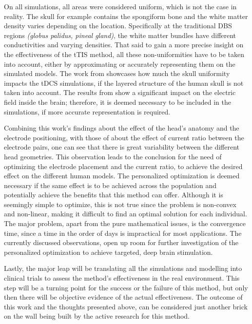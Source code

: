 On all simulations, all areas were considered uniform, which is not the case in reality. The skull for example contains the spongiform bone and the white matter density varies depending on the location. Specifically at the traditional \gls{DBS} regions \textit{(globus palidus, pineal gland)}, the white matter bundles have different conductivities and varying densities. That said to gain a more precise insight on the effectiveness of the \gls{tTIS} method, all these non-uniformities have to be taken into account, either by approximating or accurately representing them on the simulated models. The work from  showcases how much the skull uniformity impacts the \gls{tDCS} simulations, if the layered structure of the human skull is not taken into account. The results from \cite{Rampersad2013_skull_approximations} show a significant impact on the electric field inside the brain; therefore, it is deemed necessary to be included in the simulations, if more accurate representation is required.

Combining this work's findings about the effect of the head's anatomy and the electrode positioning, with those of  about the effect of current ratio between the electrode pairs, one can see that there is great variability between the different head geometries. This observation leads to the conclusion for the need of optimizing the electrode placement and the current ratio, to achieve the desired effect on the different human models. The personalized optimization is deemed necessary if the same effect is to be achieved across the population and potentially achieve the benefits that this method can offer. Although it is seemingly simple to optimize, this is not true since the problem is non-convex and non-linear, making it difficult to find an optimal solution for each individual. The major problem, apart from the pure mathematical issues, is the convergence time, since a time in the order of days is impractical for most applications. The currently discussed observations, open up room for further investigation of the personalized optimization to achieve targeted, deep brain stimulation.

Lastly, the major leap will be translating all the simulations and modelling into clinical trials to assess the method's effectiveness in the real environment. This step will be a turning point for the success or the failure of this method, but only then there will be objective evidence of the actual effectiveness. The outcome of this work and the thoughts presented above, can be considered just another brick on the wall being built by the active research for this method.
